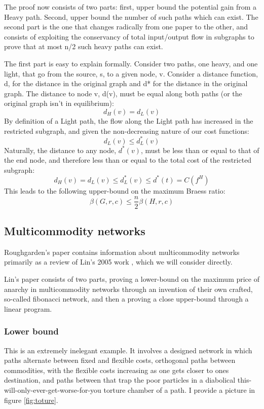 \documentclass[a4paper,12pt]{article}
\begin{document}
The proof now consists of two parts: first, upper bound the potential gain from a Heavy path. Second, upper bound the number of such paths which can exist. The second part is the one that changes radically from one paper to the other, and consists of exploiting the conservancy of total input/output flow in subgraphs to prove that at most n/2 such heavy paths can exist.

The first part is easy to explain formally. Consider two paths, one heavy, and one light, that go from the source, s, to a given node, v. Consider a distance function, d, for the distance in the original graph and d* for the distance in the original graph. The distance to node v, d(v), must be equal along both paths (or the original graph isn't in equilibrium):
%
$$
d_H(v) = d_L(v)
$$
By definition of a Light path, the flow along the Light path has increased in the restricted subgraph, and given the non-decreasing nature of our cost functions:
$$
d_L(v) \leq d^*_L(v)
$$
%
Naturally, the distance to any node, $d^*(v)$, must be less than or equal to that of the end node, and therefore less than or equal to the total cost of the restricted subgraph:
%
$$
d_H(v) = d_L(v) \leq d^*_L(v) \leq d^*(t) = C(\textit{f}^H)
$$
%
This leads to the following upper-bound on the maximum Braess ratio:
%
$$
\beta (G, r, c) \leq \frac{n}{2} \beta(H, r, c)
$$
%

\subsection*{Multicommodity networks}
Roughgarden's paper \cite{selfish} contains information about multicommodity networks primarily as a review of Lin's 2005 work \cite{fibonacci}, which we will consider directly.

Lin's paper consists of two parts, proving a lower-bound on the maximum price of anarchy in multicommodity networks through an invention of their own crafted, so-called fibonacci network, and then a proving a close upper-bound through a linear program.

\subsubsection*{Lower bound}

This is an extremely inelegant example. It involves a designed network in which paths alternate between fixed and flexible costs, orthogonal paths between commodities, with the flexible costs increasing as one gets closer to ones destination, and paths between that trap the poor particles in a diabolical this-will-only-ever-get-worse-for-you torture chamber of a path. I provide a picture in figure \ref{fig:toture}.
\end{document}
